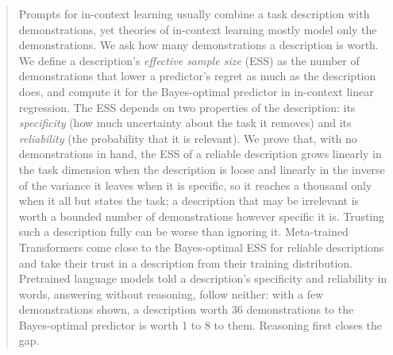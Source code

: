 \documentclass{article}
\begin{document}
\raggedbottom

\printAffiliationsAndNotice{}

\begin{abstract}
Prompts for in-context learning usually combine a task description with demonstrations, yet theories of in-context learning mostly model only the demonstrations. We ask how many demonstrations a description is worth. We define a description's \emph{effective sample size} (ESS) as the number of demonstrations that lower a predictor's regret as much as the description does, and compute it for the Bayes-optimal predictor in in-context linear regression. The ESS depends on two properties of the description: its \emph{specificity} (how much uncertainty about the task it removes) and its \emph{reliability} (the probability that it is relevant). We prove that, with no demonstrations in hand, the ESS of a reliable description grows linearly in the task dimension when the description is loose and linearly in the inverse of the variance it leaves when it is specific, so it reaches a thousand only when it all but states the task; a description that may be irrelevant is worth a bounded number of demonstrations however specific it is. Trusting such a description fully can be worse than ignoring it. Meta-trained Transformers come close to the Bayes-optimal ESS for reliable descriptions and take their trust in a description from their training distribution. Pretrained language models told a description's specificity and reliability in words, answering without reasoning, follow neither: with a few demonstrations shown, a description worth 36 demonstrations to the Bayes-optimal predictor is worth 1 to 8 to them. Reasoning first closes the gap.
\end{abstract}
\end{document}
